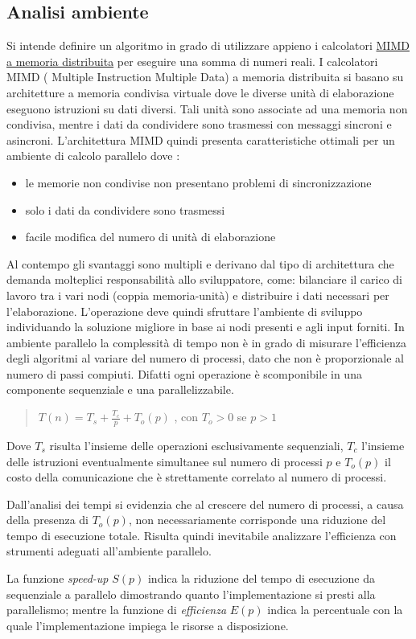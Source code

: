 \documentclass[a4paper,11pt]{book}
\begin{document}
\subsection{Analisi ambiente}
Si intende definire un algoritmo in grado di utilizzare appieno i calcolatori \underline{MIMD a memoria distribuita} per eseguire una somma di numeri reali. I calcolatori MIMD ( Multiple Instruction Multiple Data) a memoria distribuita si basano su architetture a memoria condivisa virtuale dove le diverse unità di elaborazione eseguono istruzioni su dati diversi. Tali unità sono associate ad una memoria non condivisa, mentre i dati da condividere sono trasmessi con messaggi sincroni e asincroni. L'architettura MIMD quindi presenta caratteristiche ottimali per un ambiente di calcolo parallelo dove : 
\begin{itemize}
    \item le memorie non condivise non presentano problemi di sincronizzazione
    \item solo i dati da condividere sono trasmessi
    \item facile modifica del numero di unità di elaborazione
\end{itemize}
Al contempo gli svantaggi sono multipli e derivano dal tipo di architettura che demanda molteplici responsabilità allo sviluppatore, come: bilanciare il carico di lavoro tra i vari nodi (coppia memoria-unità) e distribuire i dati necessari per l'elaborazione. 
L'operazione deve quindi sfruttare l'ambiente di sviluppo individuando la soluzione migliore in base ai nodi presenti e agli input forniti. 
In ambiente parallelo la complessità di tempo non è in grado di misurare l'efficienza degli algoritmi al variare del numero di processi, dato che non è proporzionale al numero di passi compiuti. Difatti ogni operazione è scomponibile in una componente sequenziale e una parallelizzabile.
\begin{quote}
    \centering
    $T(n) = T_s + \frac{T_c}{p}+ T_o(p)$ , con $T_o > 0$ se $p > 1$
\end{quote}
Dove $T_s$ risulta l'insieme delle operazioni esclusivamente sequenziali, $T_c$ l'insieme delle istruzioni eventualmente simultanee sul numero di processi $p$ e $T_o(p)$ il costo della comunicazione che è strettamente correlato al numero di processi. \par 
Dall'analisi dei tempi si evidenzia che al crescere del numero di processi, a causa della presenza di $T_o(p)$, non necessariamente corrisponde una riduzione del tempo di esecuzione totale. Risulta quindi inevitabile analizzare l'efficienza con strumenti adeguati all'ambiente parallelo.\par 
La funzione \textit{speed-up} $S(p)$ indica la riduzione del tempo di esecuzione da sequenziale a parallelo dimostrando quanto l'implementazione si presti alla parallelismo; mentre la funzione di \textit{efficienza} $E(p)$ indica la percentuale con la quale l'implementazione impiega le risorse a disposizione.
\end{document}
